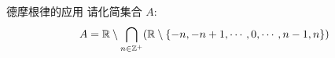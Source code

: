 \begin{frame}{}
  \begin{exampleblock}{德摩根律的应用}
    请化简集合 $A$:
    \[
      A = \mathbb{R} \setminus \bigcap_{n \in \mathbb{Z}^{+}} (\mathbb{R} \setminus \{-n, -n+1, \cdots, 0, \cdots, n-1, n\})
    \]
  \end{exampleblock}


\end{frame}
